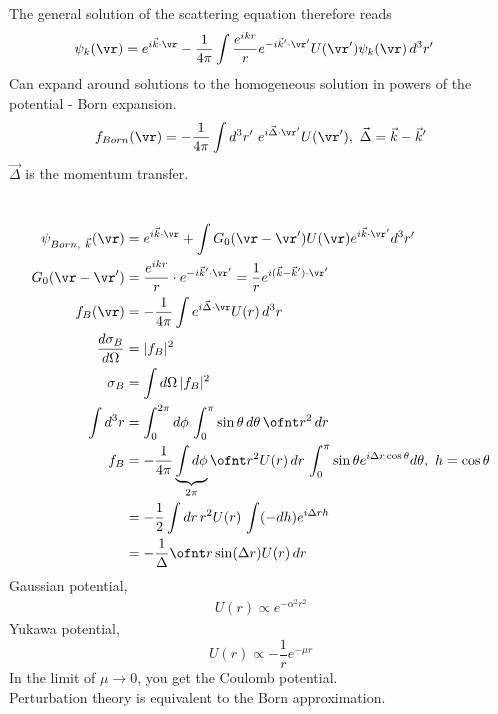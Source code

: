 \documentclass[a4paper, 11pt, normalem]{report}
\begin{document}
The general solution of the scattering equation therefore reads
\begin{align}
    \psi_k(\vr) &= e^{i\vec{k}\cdot\vr} - \frac{1}{4\pi} \int \frac{e^{ikr}}{r}e^{-i\vec{k}'\cdot\vr'}U(\vr')\psi_k(\vr)\,d^3r'
\end{align}
Can expand around solutions to the homogeneous solution in powers of the potential - Born expansion.
\begin{equation}
    f_{Born}(\vr) = -\frac{1}{4\pi}\int d^3r' ~ e^{i\vec{\Delta}\cdot\vr'}U(\vr'),~ \vec{\Delta} = \vec{k} - \vec{k}'
\end{equation}
$\vec{\Delta}$ is the momentum transfer.

\chapter{}
\begin{align}
    \psi_{Born, ~\vec{k}}(\vr) &= e^{i\vec{k}\cdot\vr} + \int G_0(\vr-\vr')U(\vr)e^{i\vec{k}\cdot\vr'}d^3r' \\
    G_0(\vr - \vr') &= \frac{e^{ikr}}{r}\cdot e^{-i\vec{k}'\cdot\vr'} = \frac{1}{r}e^{i(\vec{k}-\vec{k}')\cdot\vr'} \\
    f_B(\vr) &= -\frac{1}{4\pi}\int e^{i\vec{\Delta}\cdot\vr}U(r)\,d^3r \\
    \frac{d\sigma_B}{d\Omega} &= |f_B|^2 \\
    \sigma_B &= \int d\Omega\, |f_B|^2 \\
    \int d^3r &= \int_0^{2\pi} d\phi \, \int_0^\pi \sin\theta\,d\theta\, \ofnt r^2\,dr \\
    f_B &= -\frac{1}{4\pi} \underbrace{\int d\phi}_{2\pi} \ofnt r^2U(r)\,dr\, \int_0^\pi \sin\theta e^{i\Delta r\cos\theta}d\theta,~ h = \cos\theta \\
        &= -\frac12 \int dr\,r^2U(r)\, \int (-dh) e^{i\Delta rh} \\
        &= -\frac{1}{\Delta} \ofnt r\sin(\Delta r)U(r)\,dr
\end{align}
Gaussian potential,
\begin{align}
    U(r) \propto e^{-\alpha^2r^2}
\end{align}
Yukawa potential,
\begin{equation}
    U(r) \propto -\frac{1}{r}e^{-\mu r}
\end{equation}
In the limit of $\mu \to 0$, you get the Coulomb potential.\\
Perturbation theory is equivalent to the Born approximation.
\end{document}
